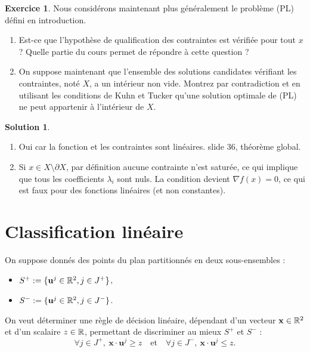 \documentclass[a4paper,francais]{article}
\newcommand{\R}{{\ensuremath\mathbb{R}}}
\theoremstyle{definition}
\newtheorem{exercice}{Exercice}[section]
\newtheorem*{solution}{Solution}
\begin{document}
\begin{exercice}
  Nous considérons maintenant plus généralement le problème (PL) défini
  en introduction. 
  \begin{enumerate}
  \item Est-ce que l'hypothèse de qualification des contraintes est vérifiée
    pour tout $x$ ? Quelle partie du cours permet de répondre à cette question ?
  \item On suppose maintenant que l'ensemble des solutions candidates vérifiant
    les contraintes, noté $X$, a un intérieur non vide. Montrez par contradiction et
    en utilisant les conditions de Kuhn et Tucker qu'une solution optimale de (PL)
    ne peut appartenir à l'intérieur de $X$.
  \end{enumerate}
\end{exercice}

\begin{solution}
  \begin{enumerate}
  \item Oui car la fonction et les contraintes sont linéaires. slide 36, théorème global. 
  \item Si $x \in X \setminus \partial X$, par définition aucune contrainte n'est saturée,
  ce qui implique que tous les coefficients $\lambda_i$ sont nuls. La condition
  devient ${\nabla f}(x) = 0$, ce qui est faux pour des fonctions linéaires (et non
  constantes).
  \end{enumerate}
\end{solution}

\section{Classification linéaire}
\label{sec:classif}

\let\vec\mathbf

On suppose donnés des points du plan partitionnés en deux sous-ensembles :
\begin{itemize}
\item $S^+ := \{ \vec{u}^j \in \R^2, j \in J^+ \}$,
\item $S^- := \{ \vec{u}^j \in \R^2, j \in J^- \}$.
\end{itemize}
On veut déterminer une règle de décision linéaire, dépendant d'un vecteur $\vec{x} \in \R^2$
et d'un scalaire $z \in \R$, permettant de discriminer au mieux $S^+$ et $S^-$ :
\begin{equation}
  \label{eq:regle}
\forall j \in J^+, \ \vec{x} \cdot \vec{u}^j \geq z
\quad \text{et} \quad
\forall j \in J^-, \ \vec{x} \cdot \vec{u}^j \leq z.
\end{equation}
\end{document}
